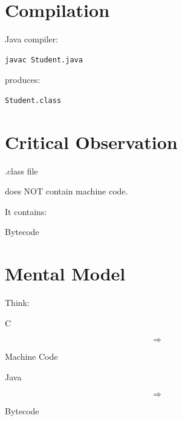 \documentclass[11pt,a4paper]{book}
\begin{document}
\section{Compilation}

Java compiler:

\begin{verbatim} 
javac Student.java
\end{verbatim}


produces:

\begin{verbatim} 
Student.class
\end{verbatim}


\section{Critical Observation}

.class file

does NOT contain machine code.


It contains:


Bytecode


\section{Mental Model}

Think:


C

\[
\Rightarrow
\]

Machine Code


Java

\[
\Rightarrow
\]

Bytecode


\end{document}
